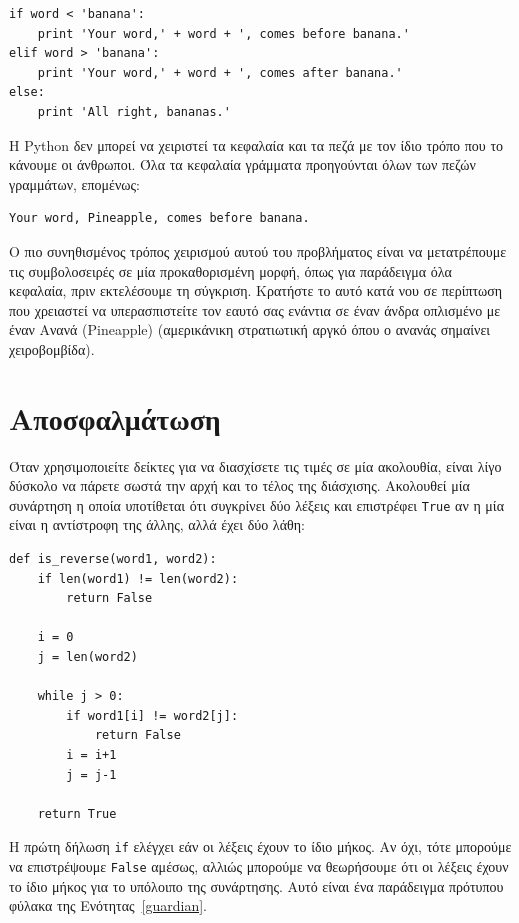 \documentclass[10pt]{book}
\begin{document}
\begin{verbatim}
if word < 'banana':
    print 'Your word,' + word + ', comes before banana.'
elif word > 'banana':
    print 'Your word,' + word + ', comes after banana.'
else:
    print 'All right, bananas.'
\end{verbatim}
%

Η Python δεν μπορεί να χειριστεί τα κεφαλαία και τα πεζά με τον ίδιο τρόπο
που το κάνουμε οι άνθρωποι. Όλα τα κεφαλαία γράμματα προηγούνται όλων των πεζών γραμμάτων, επομένως:

\begin{verbatim}
Your word, Pineapple, comes before banana.
\end{verbatim}
%

Ο πιο συνηθισμένος τρόπος χειρισμού αυτού του προβλήματος είναι να μετατρέπουμε τις συμβολοσειρές σε μία προκαθορισμένη μορφή, όπως για παράδειγμα όλα κεφαλαία, πριν εκτελέσουμε τη σύγκριση. Κρατήστε το αυτό κατά νου σε περίπτωση που χρειαστεί να υπερασπιστείτε τον εαυτό σας ενάντια σε έναν άνδρα οπλισμένο με έναν Ανανά (Pineapple) (αμερικάνικη στρατιωτική αργκό όπου ο ανανάς σημαίνει χειροβομβίδα).


\section{Αποσφαλμάτωση}

Όταν χρησιμοποιείτε δείκτες για να διασχίσετε τις τιμές σε μία ακολουθία,
είναι λίγο δύσκολο να πάρετε σωστά την αρχή και το τέλος της διάσχισης. Ακολουθεί μία συνάρτηση η οποία υποτίθεται ότι συγκρίνει δύο λέξεις και επιστρέφει {\tt True} αν η μία είναι η αντίστροφη της άλλης, αλλά έχει δύο λάθη:

\begin{verbatim}
def is_reverse(word1, word2):
    if len(word1) != len(word2):
        return False

    i = 0
    j = len(word2)

    while j > 0:
        if word1[i] != word2[j]:
            return False
        i = i+1
        j = j-1

    return True
\end{verbatim}
%

Η πρώτη δήλωση {\tt if} ελέγχει εάν οι λέξεις έχουν το ίδιο μήκος.
Αν όχι, τότε μπορούμε να επιστρέψουμε {\tt False} αμέσως, αλλιώς μπορούμε να θεωρήσουμε 
ότι οι λέξεις έχουν το ίδιο μήκος για το υπόλοιπο της συνάρτησης.
Αυτό είναι ένα παράδειγμα πρότυπου φύλακα της Ενότητας~\ref{guardian}.
\end{document}
